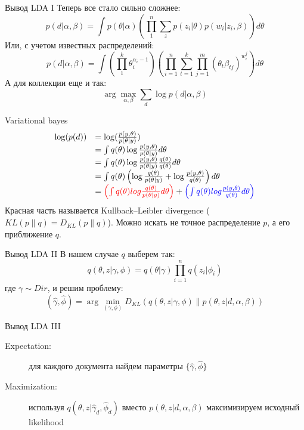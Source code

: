 \documentclass[14pt, fleqn, xcolor={dvipsnames, table}]{beamer}
\begin{document}
\begin{frame}{Вывод LDA I}
Теперь все стало сильно сложнее:
$$
p(d|\alpha, \beta) = \int p(\theta | \alpha)\left(\prod_1^n\sum_{z}p(z_i|\theta)p(w_i|z_i,\beta)\right) d\theta
$$
Или, с учетом известных распределений:
$$
p(d|\alpha, \beta) = \int \left(\prod_1^k \theta^{\alpha_i-1}_i\right)\left(\prod_{i=1}^n\sum_{t=1}^k\prod_{j=1}^m(\theta_t\beta_{tj})^{w_i^j}\right)d\theta
$$
А для коллекции еще и так:
$$
\arg \max_{\alpha, \beta} \sum_d \log p(d|\alpha, \beta)
$$
\end{frame}

\begin{frame}{Variational bayes}
$$\begin{array}{ll}
\log(p(d)) &= \log(\frac{p(y,\theta)}{p(\theta|y)}) \\
&= \int q(\theta) \log \frac{p(y,\theta)}{p(\theta|y)} d\theta \\
&= \int q(\theta) \log \frac{p(y,\theta)}{p(\theta|y)}\frac{q(\theta)}{q(\theta)} d\theta \\
&= \int q(\theta) \left(\log \frac{q(\theta)}{p(\theta|y)} + \log \frac{p(y,\theta)}{q(\theta)}\right) d\theta \\
&= {\color{red}\left(\int q(\theta) log \frac{q(\theta)}{p(\theta|y)}d\theta\right)} + {\color{blue}\left(\int q(\theta) log \frac{p(y,\theta)}{q(\theta)} d\theta\right)} \\
\end{array}$$
Красная часть называется Kullback–Leibler divergence ($KL(p\|q)=D_{KL}(p\|q)$). Можно искать не точное распределение $p$, а его приближение $q$.
\end{frame}

\begin{frame}{Вывод LDA II}
В нашем случае $q$ выберем так:
$$
q(\theta,z|\gamma,\phi) = q(\theta|\gamma) \prod_{i=1}^n q(z_i | \phi_i)
$$
где $\gamma \sim Dir$, и решим проблему:
$$
(\hat{\gamma},\hat{\phi}) = \arg \min_{(\gamma,\phi)} D_{KL}(q(\theta,z|\gamma,\phi)\|p(\theta, z|d,\alpha,\beta))
$$
\end{frame}

\begin{frame}{Вывод LDA III}
\begin{description}
  \item[Expectation:] для каждого документа найдем параметры $\{\hat{\gamma}, \hat{\phi}\}$
  \item[Maximization:] используя $q(\theta,z|\hat{\gamma}_d, \hat{\phi}_d)$ вместо $p(\theta,z|d,\alpha, \beta)$ максимизируем исходный likelihood
\end{description}
\end{frame}
\end{document}
